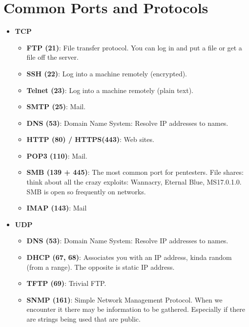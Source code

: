 \documentclass[11pt,a4paper]{article}
\begin{document}
\section{Common Ports and Protocols}

\begin{multicols}{2}
\begin{itemize}
\item \textbf{TCP}
\begin{itemize}
\item \textbf{FTP (21)}: File transfer protocol. You can log in and put a file or get a file off the server.
\item \textbf{SSH (22)}: Log into a machine remotely (encrypted).
\item \textbf{Telnet (23)}: Log into a machine remotely (plain text).
\item \textbf{SMTP (25)}: Mail.
\item \textbf{DNS (53)}: Domain Name System: Resolve IP addresses to names.
\item \textbf{HTTP (80) / HTTPS(443)}: Web sites.
\item \textbf{POP3 (110)}: Mail.
\item \textbf{SMB (139 + 445)}: The most common port for pentesters. File shares: think about all the crazy exploits: Wannacry, Eternal Blue, MS17.0.1.0. SMB is open so frequently on networks.
\item \textbf{IMAP (143)}: Mail
\end{itemize}
\end{itemize}

\vfill\null
\columnbreak
\begin{itemize}
\item \textbf{UDP}
\begin{itemize}
\item \textbf{DNS (53)}: Domain Name System: Resolve IP addresses to names.
\item \textbf{DHCP (67, 68)}: Associates you with an IP address, kinda random (from a range). The opposite is static IP address.
\item \textbf{TFTP (69)}: Trivial FTP.
\item \textbf{SNMP (161)}: Simple Network Management Protocol. When we encounter it there may be information to be gathered. Especially if there are strings being used that are public.
\end{itemize}
\end{itemize}

\end{multicols}
\end{document}
